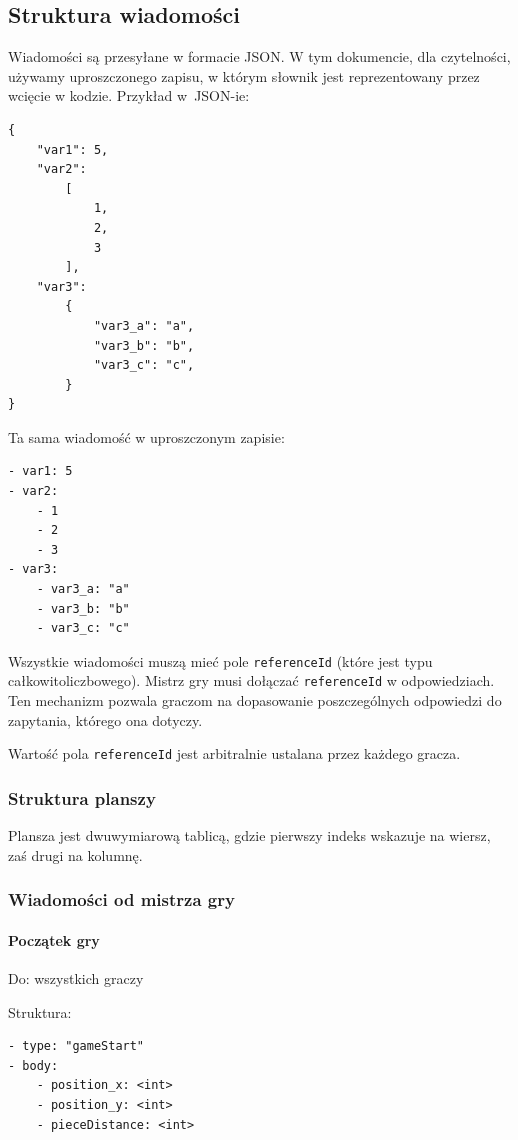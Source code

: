\documentclass[a4paper]{article}
\newcommand{\code}{\texttt}
\begin{document}
\subsection{Struktura wiadomości}

Wiadomości są przesyłane w formacie JSON.
W tym dokumencie, dla czytelności, używamy uproszczonego zapisu, w którym słownik jest reprezentowany przez wcięcie w kodzie.
Przykład w~JSON-ie:

\begin{verbatim}
{
    "var1": 5,
    "var2":
        [
            1,
            2,
            3
        ],
    "var3":
        {
            "var3_a": "a",
            "var3_b": "b",
            "var3_c": "c",
        }
}
\end{verbatim}

Ta sama wiadomość w uproszczonym zapisie:

\begin{verbatim}
- var1: 5
- var2:
    - 1
    - 2
    - 3
- var3:
    - var3_a: "a"
    - var3_b: "b"
    - var3_c: "c"
\end{verbatim}

Wszystkie wiadomości muszą mieć pole \code{referenceId} (które jest typu całkowitoliczbowego).
Mistrz gry musi dołączać \code{referenceId} w odpowiedziach.
Ten mechanizm pozwala graczom na dopasowanie poszczególnych odpowiedzi do zapytania, którego ona dotyczy.

Wartość pola \code{referenceId} jest arbitralnie ustalana przez każdego gracza.

\subsubsection{Struktura planszy}

Plansza jest dwuwymiarową tablicą, gdzie pierwszy indeks wskazuje na wiersz, zaś drugi na kolumnę.

\subsubsection{Wiadomości od mistrza gry}

\paragraph{Początek gry}
\hfill
\hfill

Do: wszystkich graczy

Struktura:

\begin{verbatim}
- type: "gameStart"
- body:
    - position_x: <int>
    - position_y: <int>
    - pieceDistance: <int>
\end{verbatim}
\end{document}
